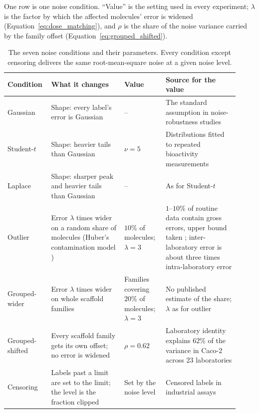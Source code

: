 One row is one noise condition. ``Value'' is the setting used in every experiment; $\lambda$ is the factor by which the affected molecules' error is widened (Equation~\ref{eq:dose_matching}), and $\rho$ is the share of the noise variance carried by the family offset (Equation~\ref{eq:grouped_shifted}).
\begin{table}[htbp]
\centering
\small
\caption[The seven noise conditions and their parameters.]{The seven noise conditions and their parameters. Every condition except censoring delivers the same root-mean-square noise at a given noise level.}
\label{tab:noise_conditions}
\begin{adjustbox}{max width=\textwidth}
\begin{tabular}{@{}P{0.15\linewidth}P{0.30\linewidth}P{0.17\linewidth}P{0.30\linewidth}@{}}
\toprule
Condition & What it changes & Value & Source for the value \\
\midrule
Gaussian & Shape: every label's error is Gaussian & -- & The standard assumption in noise-robustness studies \\
Student-$t$ & Shape: heavier tails than Gaussian & $\nu = 5$ & Distributions fitted to repeated bioactivity measurements \citep{Kruger2012} \\
Laplace & Shape: sharper peak and heavier tails than Gaussian & -- & As for Student-$t$ \citep{Kruger2012} \\
Outlier & Error $\lambda$ times wider on a random share of molecules (Huber's contamination model \citep{huber1964robust}) & $10\%$ of molecules; $\lambda = 3$ & $1$--$10\%$ of routine data contain gross errors, upper bound taken \citep{Hampel2001}; inter-laboratory error is about three times intra-laboratory error \citep{Avdeef2019} \\
Grouped-wider & Error $\lambda$ times wider on whole scaffold families & Families covering $20\%$ of molecules; $\lambda = 3$ & No published estimate of the share; $\lambda$ as for outlier \citep{Avdeef2019} \\
Grouped-shifted & Every scaffold family gets its own offset; no error is widened & $\rho = 0.62$ & Laboratory identity explains $62\%$ of the variance in Caco-2 across 23 laboratories \citep{Bentz2013} \\
Censoring & Labels past a limit are set to the limit; the level is the fraction clipped & Set by the noise level & Censored labels in industrial assays \citep{Svensson2025} \\
\bottomrule
\end{tabular}
\end{adjustbox}
\end{table}

